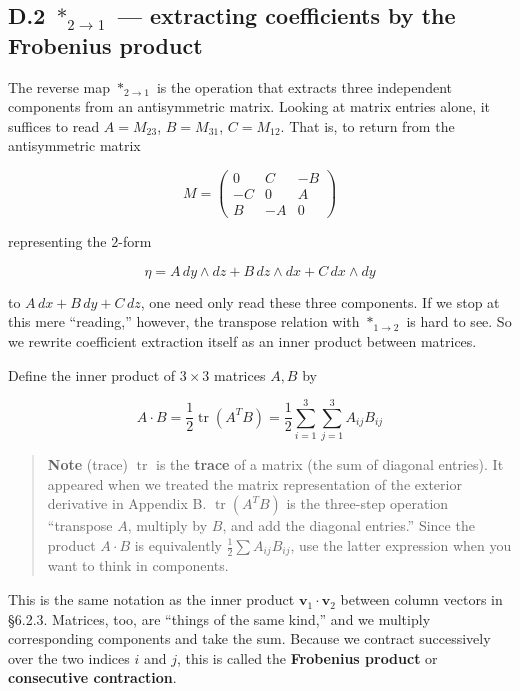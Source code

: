 \documentclass[a4paper,12pt,openany]{book}
\begin{document}
\hypertarget{d.2-ast_2to1-extracting-coefficients-by-the-frobenius-product}{%
\subsection*{\texorpdfstring{D.2 \(\ast_{2\to1}\) — extracting
coefficients by the Frobenius
product}{D.2 \textbackslash ast\_\{2\textbackslash to1\} — extracting coefficients by the Frobenius product}}\label{d.2-ast_2to1-extracting-coefficients-by-the-frobenius-product}}

The reverse map \(\ast_{2\to1}\) is the operation that extracts three
independent components from an antisymmetric matrix. Looking at matrix
entries alone, it suffices to read \(A=M_{23}\), \(B=M_{31}\),
\(C=M_{12}\). That is, to return from the antisymmetric matrix

\[
M=
\begin{pmatrix}
0 & C & -B \\
-C & 0 & A \\
B & -A & 0
\end{pmatrix}
\]

representing the \(2\)-form

\[
\eta
=
A\,dy\wedge dz
+
B\,dz\wedge dx
+
C\,dx\wedge dy
\]

to \(A\,dx+B\,dy+C\,dz\), one need only read these three components. If
we stop at this mere ``reading,'' however, the transpose relation with
\(\ast_{1\to2}\) is hard to see. So we rewrite coefficient extraction
itself as an inner product between matrices.

Define the inner product of \(3\times3\) matrices \(A,B\) by

\[
A\cdot B
=
\frac{1}{2}\operatorname{tr}(A^T B)
=
\frac{1}{2}
\sum_{i=1}^{3}
\sum_{j=1}^{3}
A_{ij}B_{ij}
\]

\begin{quote}
\textbf{Note} (trace) \(\operatorname{tr}\) is the \textbf{trace} of a
matrix (the sum of diagonal entries). It appeared when we treated the
matrix representation of the exterior derivative in Appendix B.
\(\operatorname{tr}(A^T B)\) is the three-step operation ``transpose
\(A\), multiply by \(B\), and add the diagonal entries.'' Since the
product \(A\cdot B\) is equivalently \(\frac{1}{2}\sum A_{ij}B_{ij}\),
use the latter expression when you want to think in components.
\end{quote}

This is the same notation as the inner product
\(\mathbf{v}_1 \cdot \mathbf{v}_2\) between column vectors in §6.2.3.
Matrices, too, are ``things of the same kind,'' and we multiply
corresponding components and take the sum. Because we contract
successively over the two indices \(i\) and \(j\), this is called the
\textbf{Frobenius product} or \textbf{consecutive contraction}.
\end{document}
